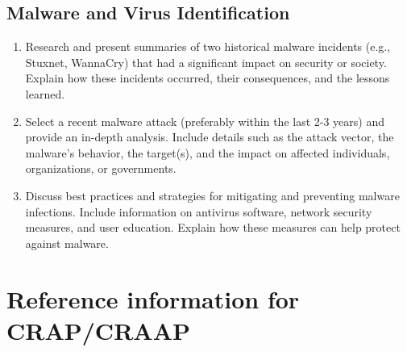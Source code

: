 \documentclass[12pt]{article}
\begin{document}
\subsection*{Malware and Virus Identification }
    \begin{enumerate}
        \item Research and present summaries of two historical malware incidents (e.g., Stuxnet, WannaCry) that had a significant impact on security or society. Explain how these incidents occurred, their consequences, and the lessons learned.
        \item Select a recent malware attack (preferably within the last 2-3 years) and provide an in-depth analysis. Include details such as the attack vector, the malware's behavior, the target(s), and the impact on affected individuals, organizations, or governments.
        \item Discuss best practices and strategies for mitigating and preventing malware infections. Include information on antivirus software, network security measures, and user education. Explain how these measures can help protect against malware.


    \end{enumerate}

    \section*{Reference information for CRAP/CRAAP}
    
\end{document}
